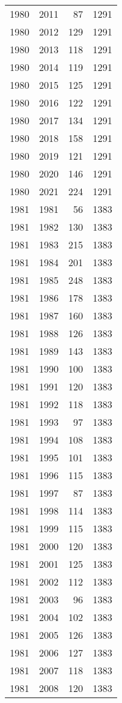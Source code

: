 \documentclass[
  10pt,
  letterpaper,
  DIV=11,
  numbers=noendperiod,
  twoside]{scrartcl}
\begin{document}
\begin{longtable}[]{@{}rrrr@{}}
1980 & 2011 & 87 & 1291 \\
1980 & 2012 & 129 & 1291 \\
1980 & 2013 & 118 & 1291 \\
1980 & 2014 & 119 & 1291 \\
1980 & 2015 & 125 & 1291 \\
1980 & 2016 & 122 & 1291 \\
1980 & 2017 & 134 & 1291 \\
1980 & 2018 & 158 & 1291 \\
1980 & 2019 & 121 & 1291 \\
1980 & 2020 & 146 & 1291 \\
1980 & 2021 & 224 & 1291 \\
1981 & 1981 & 56 & 1383 \\
1981 & 1982 & 130 & 1383 \\
1981 & 1983 & 215 & 1383 \\
1981 & 1984 & 201 & 1383 \\
1981 & 1985 & 248 & 1383 \\
1981 & 1986 & 178 & 1383 \\
1981 & 1987 & 160 & 1383 \\
1981 & 1988 & 126 & 1383 \\
1981 & 1989 & 143 & 1383 \\
1981 & 1990 & 100 & 1383 \\
1981 & 1991 & 120 & 1383 \\
1981 & 1992 & 118 & 1383 \\
1981 & 1993 & 97 & 1383 \\
1981 & 1994 & 108 & 1383 \\
1981 & 1995 & 101 & 1383 \\
1981 & 1996 & 115 & 1383 \\
1981 & 1997 & 87 & 1383 \\
1981 & 1998 & 114 & 1383 \\
1981 & 1999 & 115 & 1383 \\
1981 & 2000 & 120 & 1383 \\
1981 & 2001 & 125 & 1383 \\
1981 & 2002 & 112 & 1383 \\
1981 & 2003 & 96 & 1383 \\
1981 & 2004 & 102 & 1383 \\
1981 & 2005 & 126 & 1383 \\
1981 & 2006 & 127 & 1383 \\
1981 & 2007 & 118 & 1383 \\
1981 & 2008 & 120 & 1383 \\

\end{longtable}
\end{document}

